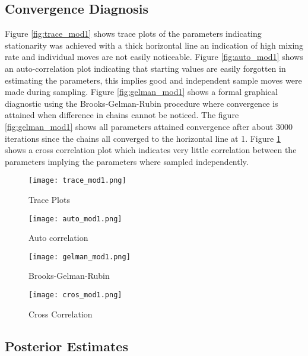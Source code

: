 \documentclass[11pt]{article}
\begin{document}
\subsection{Convergence Diagnosis}
Figure \ref{fig:trace_mod1} shows trace plots of the parameters indicating stationarity was achieved with a thick horizontal line an indication of high mixing rate and individual moves are not easily noticeable. Figure \ref{fig:auto_mod1} shows an auto-correlation plot indicating that starting values are easily forgotten in estimating the parameters, this implies good and independent sample moves were made during sampling. Figure \ref{fig:gelman_mod1} shows a formal graphical diagnostic using the Brooks-Gelman-Rubin procedure where convergence is attained when difference in chains cannot be noticed. The figure \ref{fig:gelman_mod1} shows all parameters attained convergence after about 3000 iterations since the chains all converged to the horizontal line at 1. Figure \ref{fig:cros_mod1} shows a cross correlation plot which indicates very little correlation between the parameters implying the parameters where sampled independently.

    \begin{figure}[H]
  \begin{minipage}[b]{0.4\textwidth}
    \texttt{[image: trace\_mod1.png]}
    \caption{Trace Plots}
    \label{fig:trace_mod1}
  \end{minipage}
  \hfill
  \begin{minipage}[b]{0.45\textwidth}
    \texttt{[image: auto\_mod1.png]}
    \caption{Auto correlation}
    \label{fig:auto_mod1}
  \end{minipage}
    \hfill
  \begin{minipage}[b]{0.45\textwidth}
    \texttt{[image: gelman\_mod1.png]}
    \caption{Brooks-Gelman-Rubin}
    \label{fig:gelman_mod1}
  \end{minipage}
      \hfill
  \begin{minipage}[b]{0.45\textwidth}
    \texttt{[image: cros\_mod1.png]}
    \caption{Cross Correlation}
    \label{fig:cros_mod1}
  \end{minipage}
\end{figure}




\subsection{Posterior Estimates}
\end{document}
